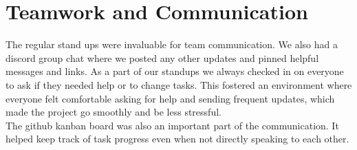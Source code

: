 \section{Teamwork and Communication}
The regular stand ups were invaluable for team communication. We also had a discord group chat where we posted any other updates and pinned helpful messages and links. As a part of our standups we always checked in on everyone to ask if they needed help or to change tasks. This fostered an environment where everyone felt comfortable asking for help and sending frequent updates, which made the project go smoothly and be less stressful. \\
The github kanban board was also an important part of the communication. It helped keep track of task progress even when not directly speaking to each other. 

